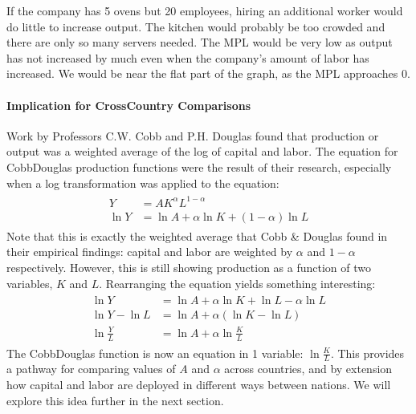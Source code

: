 \documentclass[letterpaper,10pt,english]{jupyterBook}
\begin{document}
\sphinxAtStartPar
If the company has 5 ovens but 20 employees, hiring an additional worker would do little to increase output. The kitchen would probably be too crowded and there are only so many servers needed. The MPL would be very low as output has not increased by much even when the company’s amount of labor has increased. We would be near the flat part of the graph, as the MPL approaches 0.


\paragraph{Implication for Cross\sphinxhyphen{}Country Comparisons}
\label{\detokenize{content/04-production/production:implication-for-cross-country-comparisons}}
\sphinxAtStartPar
Work by Professors C.W. Cobb and P.H. Douglas found that production or output was a weighted average of the log of capital and labor. The equation for Cobb\sphinxhyphen{}Douglas production functions were the result of their research, especially when a log transformation was applied to the equation:
\begin{equation*}
\begin{split}\begin{aligned}
Y &= A K^\alpha L^{1 - \alpha} \\
\ln Y &= \ln A + \alpha \ln K + (1 - \alpha) \ln L
\end{aligned}\end{split}
\end{equation*}
\sphinxAtStartPar
Note that this is exactly the weighted average that Cobb \& Douglas found in their empirical findings: capital and labor are weighted by \(\alpha\) and \(1 - \alpha\) respectively. However, this is still showing production as a function of two variables, \(K\) and \(L\). Rearranging the equation yields something interesting:
\begin{equation*}
\begin{split}\begin{aligned}
\ln Y &= \ln A + \alpha \ln K + \ln L - \alpha \ln L \\
\ln Y- \ln L &= \ln A + \alpha \left ( \ln K - \ln L \right ) \\
\ln \frac{Y}{L} &= \ln A + \alpha \ln \frac{K}{L}
\end{aligned}\end{split}
\end{equation*}
\sphinxAtStartPar
The Cobb\sphinxhyphen{}Douglas function is now an equation in 1 variable: \(\ln \frac{K}{L}\). This provides a pathway for comparing values of \(A\) and \(\alpha\) across countries, and by extension how capital and labor are deployed in different ways between nations. We will explore this idea further in the next section.
\end{document}
